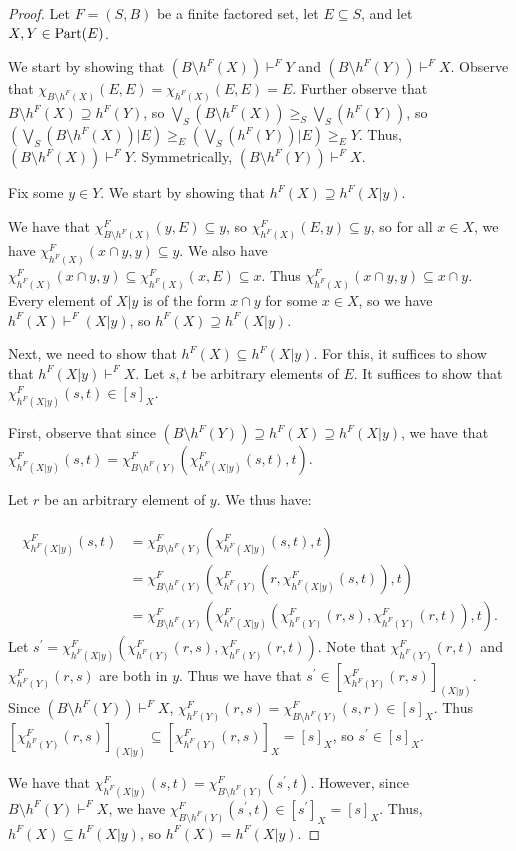 \documentclass[authordate,onecolumn]{miri-tech-article}
\begin{document}
\begin{proof}
Let $F=(S,B)$ be a finite factored set, let $E\subseteq S$, and let $X,Y\in \parts[E]$.

We start by showing that $(B\setminus h^F(X))\vdash^F Y$ and $(B\setminus h^F(Y))\vdash^F X$. Observe that $\chi_{B\setminus h^F(X)}(E,E)=\chi_{ h^F(X)}(E,E)=E$. Further observe that $B\setminus h^F(X)\supseteq h^F(Y)$, so $\bigvee_S(B\setminus h^F(X))\geq_S \bigvee_S(h^F(Y))$, so $(\bigvee_S(B\setminus h^F(X))|E)\geq_E (\bigvee_S(h^F(Y))|E)\geq_E Y$. Thus, $(B\setminus h^F(X))\vdash^F Y$. Symmetrically, $(B\setminus h^F(Y))\vdash^F X$.

Fix some $y\in Y$. We start by showing that $h^F(X)\supseteq h^F(X|y)$. 

We have that $\chi^F_{B\setminus h^F(X)}(y, E)\subseteq y$, so $\chi^F_{h^F(X)}(E, y)\subseteq y$, so for all $x\in X$, we have $\chi^F_{h^F(X)}(x\cap y, y)\subseteq y$. We also have $\chi^F_{h^F(X)}(x\cap y, y)\subseteq \chi^F_{h^F(X)}(x, E)\subseteq x$. Thus  $\chi^F_{h^F(X)}(x\cap y, y)\subseteq x\cap y$. Every element of $X|y$ is of the form $x\cap y$ for some $x\in X$, so we have $h^F(X)\vdash^F(X|y)$, so $h^F(X)\supseteq h^F(X|y)$.

Next, we need to show that $h^F(X)\subseteq h^F(X|y)$. For this, it suffices to show that $h^F(X|y)\vdash^F X$. Let $s,t$ be arbitrary elements of $E$. It suffices to show that $\chi^F_{h^F(X|y)}(s,t)\in [s]_X$. 

First, observe that since $(B\setminus h^F(Y))\supseteq h^F(X)\supseteq h^F(X|y)$, we have that $\chi^F_{h^F(X|y)}(s,t)=\chi^F_{B\setminus h^F(Y)}(\chi^F_{h^F(X|y)}(s,t),t)$.

Let $r$ be an arbitrary element of $y$. We thus have:

\begin{equation}
\begin{split}
\chi^F_{h^F(X|y)}(s,t) & = \chi^F_{B\setminus h^F(Y)}(\chi^F_{h^F(X|y)}(s,t),t) \\
 & = \chi^F_{B\setminus h^F(Y)}(\chi^F_{h^F(Y)}(r,\chi^F_{h^F(X|y)}(s,t)),t)\\
  & = \chi^F_{B\setminus h^F(Y)}(\chi^F_{h^F(X|y)}(\chi^F_{h^F(Y)}(r,s),\chi^F_{h^F(Y)}(r,t)),t).
\end{split}
\end{equation}
Let $s^\prime=\chi^F_{h^F(X|y)}(\chi^F_{h^F(Y)}(r,s),\chi^F_{h^F(Y)}(r,t))$. Note that $\chi^F_{h^F(Y)}(r,t)$ and $\chi^F_{h^F(Y)}(r,s)$ are both in $y$. Thus we have that $s^\prime\in [\chi^F_{h^F(Y)}(r,s)]_{(X|y)}$. Since $(B\setminus h^F(Y))\vdash^F X$, $\chi^F_{h^F(Y)}(r,s)=\chi^F_{B\setminus h^F(Y)}(s,r)\in [s]_X$. Thus $[\chi^F_{h^F(Y)}(r,s)]_{(X|y)}\subseteq[\chi^F_{h^F(Y)}(r,s)]_{X}=[s]_X$, so $s^\prime\in[s]_X$.

We have that $\chi^F_{h^F(X|y)}(s,t) =\chi^F_{B\setminus h^F(Y)}(s^\prime,t)$. However, since $B\setminus h^F(Y)\vdash^F X$, we have $\chi^F_{B\setminus h^F(Y)}(s^\prime,t)\in [s^\prime]_X=[s]_X$. Thus, $h^F(X)\subseteq h^F(X|y)$, so $h^F(X)=h^F(X|y)$.

\end{proof}
\end{document}
